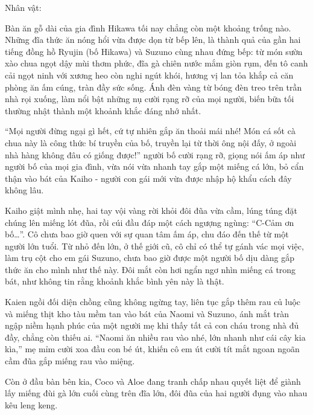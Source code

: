 \documentclass[../main.tex]{subfiles}
\begin{document}
\begin{center}
{\caviar\fontsize{12pt}{12pt}\selectfont Nhân vật:       }
\end{center}

Bàn ăn gỗ dài của gia đình Hikawa tối nay chẳng còn một khoảng trống nào. Những đĩa thức ăn nóng hổi vừa được dọn từ bếp lên, là thành quả của gần hai tiếng đồng hồ Ryujin (bố Hikawa) và Suzuno cùng nhau đứng bếp: từ món sườn xào chua ngọt dậy mùi thơm phức, đĩa gà chiên nước mắm giòn rụm, đến tô canh cải ngọt ninh với xương heo còn nghi ngút khói, hương vị lan tỏa khắp cả căn phòng ăn ấm cúng, tràn đầy sức sống. Ánh đèn vàng từ bóng đèn treo trên trần nhà rọi xuống, làm nổi bật những nụ cười rạng rỡ của mọi người, biến bữa tối thường nhật thành một khoảnh khắc đáng nhớ nhất.

``Mọi người đừng ngại gì hết, cứ tự nhiên gắp ăn thoải mái nhé! Món cá sốt cà chua này là công thức bí truyền của bố, truyền lại từ thời ông nội đấy, ở ngoài nhà hàng không đâu có giống được!'' người bố cười rạng rỡ, giọng nói ấm áp như người bố của mọi gia đình, vừa nói vừa nhanh tay gắp một miếng cá lớn, bỏ cẩn thận vào bát của Kaiho - người con gái mới vừa được nhập hộ khẩu cách đây không lâu.

Kaiho giật mình nhẹ, hai tay vội vàng rời khỏi đôi đũa vừa cầm, lúng túng đặt chúng lên miếng lót đũa, rồi cúi đầu đáp một cách ngượng ngùng: ``C-Cảm ơn bố\dots''. Cô chưa bao giờ quen với sự quan tâm ấm áp, chu đáo đến thế từ một người lớn tuổi. Từ nhỏ đến lớn, ở thế giới cũ, cô chỉ có thể tự gánh vác mọi việc, làm trụ cột cho em gái Suzuno, chưa bao giờ được một người bố dịu dàng gắp thức ăn cho mình như thế này. Đôi mắt còn hơi ngẩn ngơ nhìn miếng cá trong bát, như không tin rằng khoảnh khắc bình yên này là thật.

Kaien ngồi đối diện chồng cũng không ngừng tay, liên tục gắp thêm rau củ luộc và miếng thịt kho tàu mềm tan vào bát của Naomi và Suzuno, ánh mắt tràn ngập niềm hạnh phúc của một người mẹ khi thấy tất cả con cháu trong nhà đủ đầy, chẳng còn thiếu ai. ``Naomi ăn nhiều rau vào nhé, lớn nhanh như cái cây kia kìa,'' mẹ mỉm cười xoa đầu con bé út, khiến cô em út cười tít mắt ngoan ngoãn cầm đũa gắp miếng rau vào miệng.

Còn ở đầu bàn bên kia, Coco và Aloe đang tranh chấp nhau quyết liệt để giành lấy miếng đùi gà lớn cuối cùng trên đĩa lớn, đôi đũa của hai người đụng vào nhau kêu leng keng.
\end{document}
